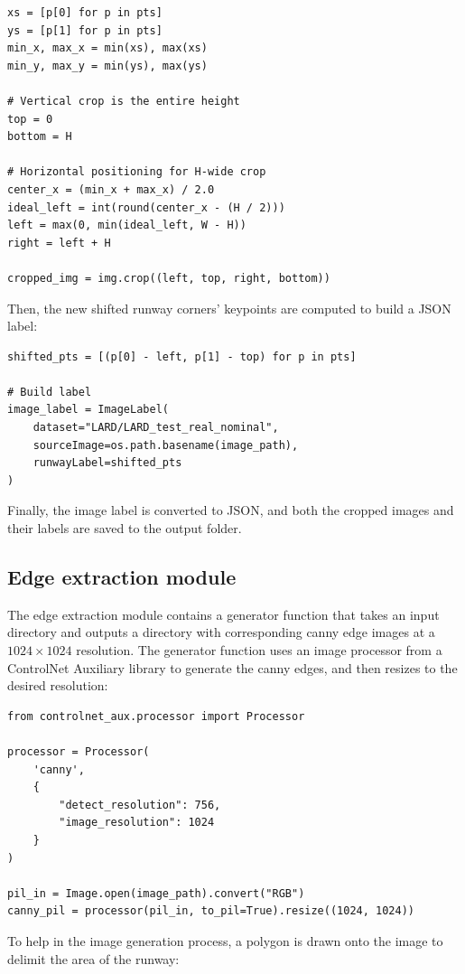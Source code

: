 \begin{lstlisting}
xs = [p[0] for p in pts]
ys = [p[1] for p in pts]
min_x, max_x = min(xs), max(xs)
min_y, max_y = min(ys), max(ys)

# Vertical crop is the entire height
top = 0
bottom = H

# Horizontal positioning for H-wide crop
center_x = (min_x + max_x) / 2.0
ideal_left = int(round(center_x - (H / 2)))
left = max(0, min(ideal_left, W - H))
right = left + H

cropped_img = img.crop((left, top, right, bottom))
\end{lstlisting}

Then, the new shifted runway corners' keypoints are computed to build a JSON label:

\begin{lstlisting}
shifted_pts = [(p[0] - left, p[1] - top) for p in pts]

# Build label
image_label = ImageLabel(
    dataset="LARD/LARD_test_real_nominal",
    sourceImage=os.path.basename(image_path),
    runwayLabel=shifted_pts
)
\end{lstlisting}

Finally, the image label is converted to JSON, and both the cropped images and their labels are saved to the output folder.

\subsection{Edge extraction module}

The edge extraction module contains a generator function that takes an input directory and outputs a directory with corresponding canny edge images at a $1024 \times 1024$ resolution. 
The generator function uses an image processor from a ControlNet Auxiliary library to generate the canny edges, and then resizes to the desired resolution:

\begin{lstlisting}
from controlnet_aux.processor import Processor

processor = Processor(
    'canny',
    {
        "detect_resolution": 756,
        "image_resolution": 1024
    }
)

pil_in = Image.open(image_path).convert("RGB")
canny_pil = processor(pil_in, to_pil=True).resize((1024, 1024))
\end{lstlisting}

To help in the image generation process, a polygon is drawn onto the image to delimit the area of the runway:

